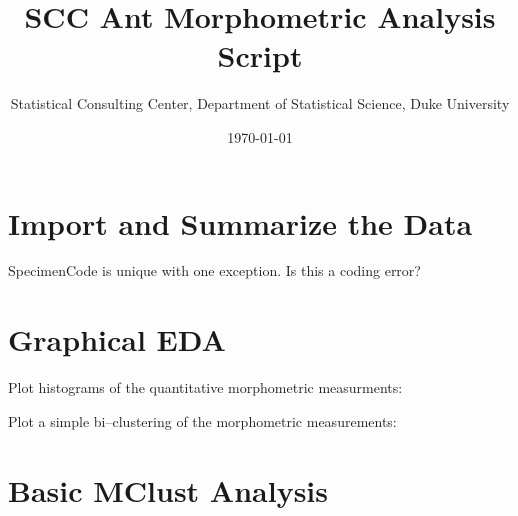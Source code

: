 \documentclass{article}
\title{SCC Ant Morphometric Analysis Script}
\author{Statistical Consulting Center, Department of Statistical Science, Duke University}
\date{\today}
\begin{document}

\maketitle

\section{Import and Summarize the Data}




SpecimenCode is unique with one exception.  Is this a coding error?


\section{Graphical EDA}

Plot histograms of the quantitative morphometric measurments:


Plot a simple bi--clustering of the morphometric measurements:


\section{Basic MClust Analysis}
\end{document}
